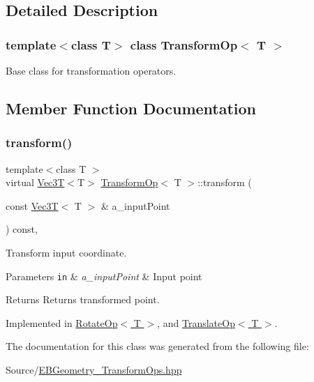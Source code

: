\subsection{Detailed Description}
\subsubsection*{template$<$class T$>$\newline
class Transform\+Op$<$ T $>$}

Base class for transformation operators. 

\subsection{Member Function Documentation}
\mbox{\label{classTransformOp_a61c1920daa9f55fd2ea9095cbcfa18b8}} 
\subsubsection{\texorpdfstring{transform()}{transform()}}
{\footnotesize\ttfamily template$<$class T $>$ \\
virtual \hyperlink{classVec3T}{Vec3T}$<$T$>$ \hyperlink{classTransformOp}{Transform\+Op}$<$ T $>$\+::transform (\begin{DoxyParamCaption}\item[{const \hyperlink{classVec3T}{Vec3T}$<$ T $>$ \&}]{a\+\_\+input\+Point }\end{DoxyParamCaption}) const\hspace{0.3cm}{\ttfamily [pure virtual]}, {\ttfamily [noexcept]}}



Transform input coordinate. 


\begin{DoxyParams}[1]{Parameters}
\mbox{\tt in}  & {\em a\+\_\+input\+Point} & Input point \\
\hline
\end{DoxyParams}
\begin{DoxyReturn}{Returns}
Returns transformed point. 
\end{DoxyReturn}


Implemented in \hyperlink{classRotateOp_aaffc25806ef6b9d7ea6651aa2bb9767c}{Rotate\+Op$<$ T $>$}, and \hyperlink{classTranslateOp_a16941d9e52b02d39f9c92f6b23f61af6}{Translate\+Op$<$ T $>$}.



The documentation for this class was generated from the following file\+:\begin{DoxyCompactItemize}
\item 
Source/\hyperlink{EBGeometry__TransformOps_8hpp}{E\+B\+Geometry\+\_\+\+Transform\+Ops.\+hpp}\end{DoxyCompactItemize}
